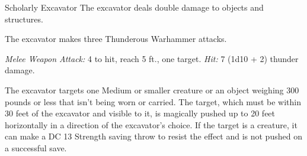 \documentclass[10pt,a4paper,twoside,bg=print,twocolumn,openany,nodeprecatedcode]{dndbook}
\begin{document}
\begin{DndMonster}[float=t]{Scholarly Excavator}
\DndMonsterBasics[
armor-class = {16 (\textit{breastplate})},
hit-points = {\DndDice{9d8 + 27}},
speed = {30 ft.}
]
\DndMonsterAbilityScores[
 str = 15,
 dex = 14,
 con = 16,
 int = 14,
 wis = 14,
 cha = 12
]
\DndMonsterDetails[
saving-throws = {Con +5, Int +4},
skills = {Arcana +4, Athletics +4, History +4},
languages = {Common plus two other languages},
challenge = 3,
]
The excavator deals double damage to objects and structures.

The excavator makes three Thunderous Warhammer attacks.

\textsl{Melee Weapon Attack:} 4 to hit, reach 5 ft., one target. \textsl{Hit:} 7 (1d10 + 2) thunder damage.

The excavator targets one Medium or smaller creature or an object weighing 300 pounds or less that isn't being worn or carried. The target, which must be within 30 feet of the excavator and visible to it, is magically pushed up to 20 feet horizontally in a direction of the excavator's choice. If the target is a creature, it can make a DC 13 Strength saving throw to resist the effect and is not pushed on a successful save.

\end{DndMonster}
\end{document}
